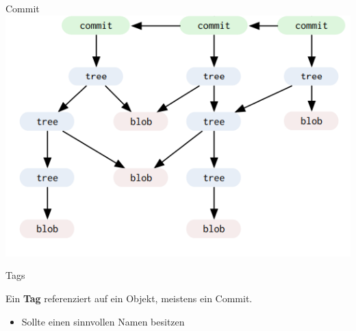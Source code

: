 \begin{frame}{Commit}
  \href{https://medium.com/@gohberg/the-biggest-misconception-about-git-b2f87d97ed52}{\includegraphics[scale=0.5]{./section/pictures/internes.png}}

\end{frame}

\begin{frame}{Tags}
  \begin{Definition}
    Ein \textbf{Tag} referenziert auf ein Objekt, meistens ein Commit.
  \end{Definition}
  \begin{itemize}
    \pause
    \item Sollte einen sinnvollen Namen besitzen
  \end{itemize}

\end{frame}


